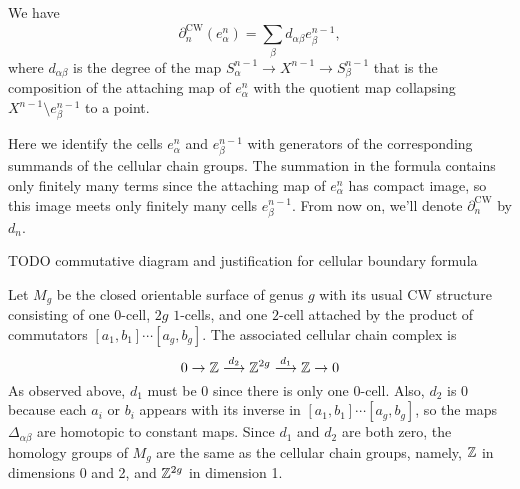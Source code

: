 \begin{prop}
   We have \[
       \partial _n ^{\text{CW}}(e_{\alpha }^n )=\sum_{\beta }^{} d_{\alpha \beta }e_{\beta }^{n-1},
   \] where $d_{\alpha \beta }$ is the degree of the map $S_{\alpha }^{n-1}\to X^{n-1}\to S_{\beta }^{n-1}$ that is the composition of the attaching map of $e_{\alpha }^n $ with the quotient map collapsing $X^{n-1}\setminus  e_{\beta }^{n-1}$ to a point. 
\end{prop}
Here we identify the cells $e_{\alpha }^n $ and $e_{\beta }^{n-1}$ with generators of the corresponding summands of the cellular chain groups. The summation in the formula contains only finitely many terms since the attaching map of $e_{\alpha }^n $ has compact image, so this image meets only finitely many cells $e_{\beta }^{n-1}$. From now on, we'll denote $\partial _n ^{\text{CW}}$ by $d_n $.

TODO commutative diagram and justification for cellular boundary formula

\begin{example}
    Let $M_g$ be the closed orientable surface of genus $g$ with its usual CW structure consisting of one $0$-cell, $2g$ $1$-cells, and one $2$-cell attached by the product of commutators $[a_1,b_1]\cdots [a_g,b_g]$. The associated cellular chain complex is \[
    0\to \mathbb{Z} \overset{d_2}{\longrightarrow}\mathbb{Z}^{2g} \overset{d_1}{\longrightarrow}\mathbb{Z} \to 0
\] As observed above, $d_1$ must be 0 since there is only one $0$-cell. Also, $d_2$ is 0 because each $a_i $ or $b_i $ appears with its inverse in $[a_1,b_1]\cdots [a_g,b_g]$, so the maps $\Delta _{\alpha \beta }$ are homotopic to constant maps. Since $d_1$ and $d_2$ are both zero, the homology groups of $M_g$ are the same as the cellular chain groups, namely, $\mathbb{Z}$ in dimensions 0 and 2, and $\mathbb{Z}^{2g}$ in dimension 1.
\end{example}
